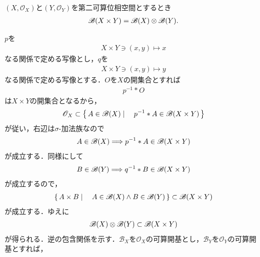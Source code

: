 	\begin{prf}
		
	\end{prf}
	
	\begin{screen}
		\begin{thm}[第二可算空間のCartesian積のBorel集合族]
		\label{thm:Borel_algebra_of_Cartesianproducts_of_second_countable_spaces}
			$(X,\mathscr{O}_X)$と$(Y,\mathscr{O}_Y)$を第二可算位相空間とするとき
			\begin{align}
				\mathscr{B}(X \times Y) = \mathscr{B}(X) \otimes \mathscr{B}(Y).
			\end{align}
		\end{thm}
	\end{screen}
	
	\begin{sketch}
		$p$を
		\begin{align}
			X \times Y \ni (x,y) \longmapsto x
		\end{align}
		なる関係で定める写像とし，$q$を
		\begin{align}
			X \times Y \ni (x,y) \longmapsto y
		\end{align}
		なる関係で定める写像とする．$O$を$X$の開集合とすれば
		\begin{align}
			p^{-1} \ast O
		\end{align}
		は$X \times Y$の開集合となるから，
		\begin{align}
			\mathscr{O}_X \subset \left\{\, A \in \mathscr{B}(X) \mid \quad p^{-1} \ast A \in \mathscr{B}(X \times Y)\, \right\}
		\end{align}
		が従い，右辺は$\sigma$-加法族なので
		\begin{align}
			A \in \mathscr{B}(X) \Longrightarrow p^{-1} \ast A \in \mathscr{B}(X \times Y)
		\end{align}
		が成立する．同様にして
		\begin{align}
			B \in \mathscr{B}(Y) \Longrightarrow q^{-1} \ast B \in \mathscr{B}(X \times Y)
		\end{align}
		が成立するので，
		\begin{align}
			\left\{\, A \times B \mid \quad A \in \mathscr{B}(X) \wedge B \in \mathscr{B}(Y)\, \right\} \subset \mathscr{B}(X \times Y)
		\end{align}
		が成立する．ゆえに
		\begin{align}
			\mathscr{B}(X) \otimes \mathscr{B}(Y) \subset \mathscr{B}(X \times Y)
		\end{align}
		が得られる．逆の包含関係を示す．$\mathscr{B}_X$を$\mathscr{O}_X$の可算開基とし，$\mathscr{B}_Y$を$\mathscr{O}_Y$の可算開基とすれば，
		\begin{align}

\end{align}
\end{sketch}
